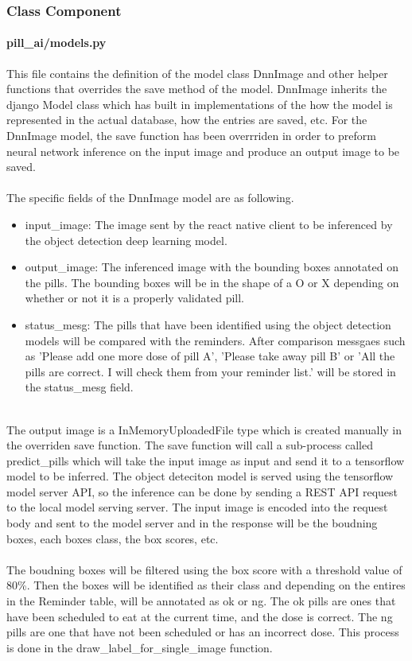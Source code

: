 \documentclass[conference]{IEEEtran}
\begin{document}
\subsubsection{Class Component}
\paragraph{pill\_ai/models.py}
This file contains the definition of the model class DnnImage and other helper functions that overrides the save method of the model. DnnImage inherits the django Model class which has built in implementations of the how the model is represented in the actual database, how the entries are saved, etc. For the DnnImage model, the save function has been overrriden in order to preform neural network inference on the input image and produce an output image to be saved. \\ \\
The specific fields of the DnnImage model are as following. 
\begin{itemize}
    \item input\_image: The image sent by the react native client to be inferenced by the object detection deep learning model.
    \item output\_image: The inferenced image with the bounding boxes annotated on the pills. The bounding boxes will be in the shape of a O or X depending on whether or not it is a properly validated pill.
    \item status\_mesg: The pills that have been identified using the object detection models will be compared with the reminders. After comparison messgaes such as 'Please add one more dose of pill A', 'Please take away pill B' or 'All the pills are correct. I will check them from your reminder list.' will be stored in the status\_mesg field.
\end{itemize}
\noindent
\\
The output image is a InMemoryUploadedFile type which is created manually in the overriden save function. The save function will call a sub-process called predict\_pills which will take the input image as input and send it to a tensorflow model to be inferred. The object deteciton model is served using the tensorflow model server API, so the inference can be done by sending a REST API request to the local model serving server. The input image is encoded into the request body and sent to the model server and in the response will be the boudning boxes, each boxes class, the box scores, etc. \\ \\
The boudning boxes will be filtered using the box score with a threshold value of 80\%. Then the boxes will be identified as their class and depending on the entires in the Reminder table, will be annotated as ok or ng. The ok pills are ones that have been scheduled to eat at the current time, and the dose is correct. The ng pills are one that have not been scheduled or has an incorrect dose. This process is done in the draw\_label\_for\_single\_image function.\\
\end{document}
